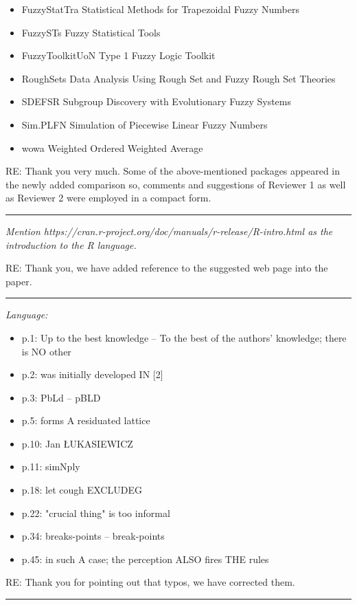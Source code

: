 \documentclass{article}
\newcommand{\separator}{\rule{\textwidth}{0.4pt}}
\begin{document}
{\begin{itemize}
    \item FuzzyStatTra Statistical Methods for Trapezoidal Fuzzy Numbers
    \item FuzzySTs Fuzzy Statistical Tools
    \item FuzzyToolkitUoN Type 1 Fuzzy Logic Toolkit
    \item RoughSets Data Analysis Using Rough Set and Fuzzy Rough Set Theories
    \item SDEFSR Subgroup Discovery with Evolutionary Fuzzy Systems
    \item Sim.PLFN Simulation of Piecewise Linear Fuzzy Numbers
    \item wowa Weighted Ordered Weighted Average
\end{itemize} }

{RE: Thank you very much. Some of the above-mentioned packages appeared in the newly added comparison so, comments and suggestions of Reviewer 1 as well as Reviewer 2 were employed in a compact form.}

\separator

{ \it Mention https://cran.r-project.org/doc/manuals/r-release/R-intro.html as the introduction to the R language. }

RE: Thank you, we have added reference to the suggested web page into the paper.

\separator

{ \it Language:
\begin{itemize}
    \item p.1: Up to the best knowledge -- To the best of the authors' knowledge; there is NO other
    \item p.2: was initially developed IN [2]
    \item p.3: PbLd -- pBLD
    \item p.5: forms A residuated lattice
    \item p.10: Jan ŁUKASIEWICZ
    \item p.11: simNply
    \item p.18: let cough EXCLUDEG
    \item p.22: "crucial thing" is too informal
    \item p.34: breaks-points -- break-points
    \item p.45: in such A case; the perception ALSO fires THE rules
\end{itemize} }

RE: Thank you for pointing out that typos, we have corrected them. 

\separator
\end{document}
